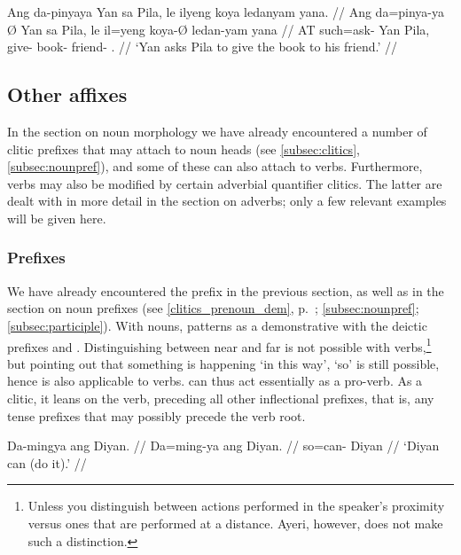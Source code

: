 \a\begingl
	\gla Ang da-pinyaya {} Yan sa Pila, \normalfont{[}le ilyeng koya 
		ledanyam yana\normalfont{]}. //
	\glb Ang da=pinya-ya Ø Yan sa Pila, le il=yeng koya-Ø ledan-yam
		yana //
	\glc AT such=ask-\TsgM{} \Top{} Yan \Parg{} Pila, \PatTI{} give-\TsgF{} 
		book-\Top{} friend-\Dat{} \TsgM{}.\Gen{} //
	\glft `Yan asks Pila to give the book to his friend.' //
\endgl
\xe


\subsection{Other affixes}

In the section on noun morphology we have already encountered a number of
clitic prefixes that may attach to noun heads (see \autoref{subsec:clitics},
\autoref{subsec:nounpref}),  and some of these can also attach to verbs.
Furthermore, verbs may also be  modified by certain adverbial quantifier
clitics. The latter are dealt with in  more detail in the section on adverbs;
only a few relevant examples will be  given here.

\subsubsection{Prefixes}
\label{subsubsec:verbprefixes}

We have already encountered the prefix  in the
previous section, as well as in the section on noun prefixes (see
\autoref{clitics_prenoun_dem}, p.~\pageref{clitics_prenoun_dem}; 
\ref{subsec:nounpref}; \ref{subsec:participle}). With nouns,
 patterns as a demonstrative with the deictic prefixes
 and . Distinguishing between near
and far is not possible with verbs,\footnote{Unless you distinguish between
actions performed in the speaker's proximity versus ones that are performed at
a distance. Ayeri, however, does not make such a distinction.} but pointing
out that something is happening `in this way', `so' is still possible, hence
 is also applicable to verbs.  can thus act
essentially as a pro-verb. As a clitic, it leans on the verb, preceding all
other inflectional prefixes, that is, any tense prefixes that may possibly
precede the verb root.

\pex\label{ex:daproverb}
\a\begingl
	\gla Da-mingya ang Diyan. //
	\glb Da=ming-ya ang Diyan. //
	\glc so=can-\TsgM{} \Aarg{} Diyan //
	\glft `Diyan can (do it).' //
\endgl

